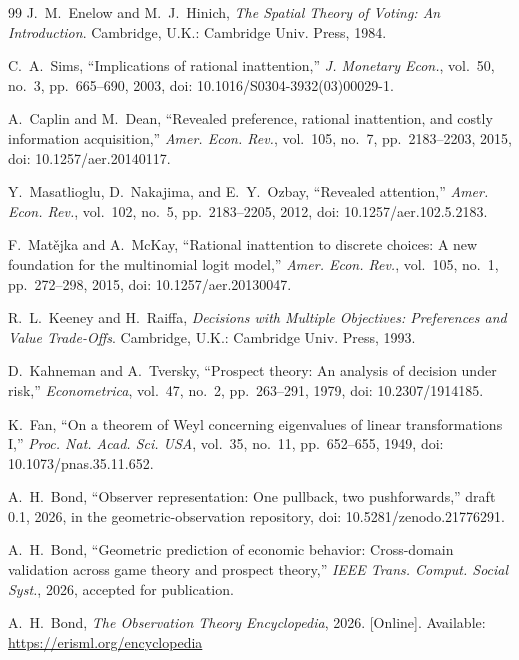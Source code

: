 \documentclass[11pt]{article}
\theoremstyle{definition}
\theoremstyle{remark}
\begin{document}
\begin{thebibliography}{99}
J.~M.~Enelow and M.~J.~Hinich, \emph{The Spatial Theory of Voting: An Introduction}. Cambridge, U.K.: Cambridge Univ. Press, 1984.

C.~A.~Sims, ``Implications of rational inattention,'' \emph{J. Monetary Econ.}, vol.~50, no.~3, pp.~665--690, 2003, doi: 10.1016/S0304-3932(03)00029-1.

A.~Caplin and M.~Dean, ``Revealed preference, rational inattention, and costly information acquisition,'' \emph{Amer. Econ. Rev.}, vol.~105, no.~7, pp.~2183--2203, 2015, doi: 10.1257/aer.20140117.

Y.~Masatlioglu, D.~Nakajima, and E.~Y.~Ozbay, ``Revealed attention,'' \emph{Amer. Econ. Rev.}, vol.~102, no.~5, pp.~2183--2205, 2012, doi: 10.1257/aer.102.5.2183.

F.~Mat\v{e}jka and A.~McKay, ``Rational inattention to discrete choices: A new foundation for the multinomial logit model,'' \emph{Amer. Econ. Rev.}, vol.~105, no.~1, pp.~272--298, 2015, doi: 10.1257/aer.20130047.

R.~L.~Keeney and H.~Raiffa, \emph{Decisions with Multiple Objectives: Preferences and Value Trade-Offs}. Cambridge, U.K.: Cambridge Univ. Press, 1993.

D.~Kahneman and A.~Tversky, ``Prospect theory: An analysis of decision under risk,'' \emph{Econometrica}, vol.~47, no.~2, pp.~263--291, 1979, doi: 10.2307/1914185.

K.~Fan, ``On a theorem of Weyl concerning eigenvalues of linear transformations I,'' \emph{Proc. Nat. Acad. Sci. USA}, vol.~35, no.~11, pp.~652--655, 1949, doi: 10.1073/pnas.35.11.652.

A.~H.~Bond, ``Observer representation: One pullback, two pushforwards,'' draft 0.1, 2026, in the geometric-observation repository, doi: 10.5281/zenodo.21776291.

A.~H.~Bond, ``Geometric prediction of economic behavior: Cross-domain validation across game theory and prospect theory,'' \emph{IEEE Trans. Comput. Social Syst.}, 2026, accepted for publication.

A.~H.~Bond, \emph{The Observation Theory Encyclopedia}, 2026. [Online]. Available: \url{https://erisml.org/encyclopedia}

\end{thebibliography}
\end{document}
